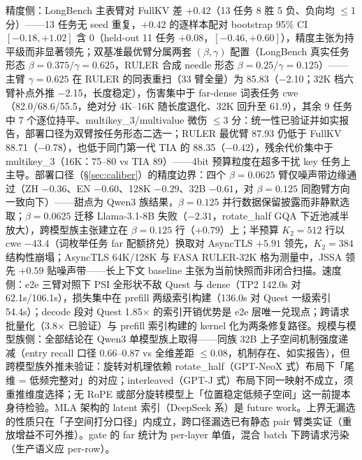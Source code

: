 \documentclass[11pt]{article}
\begin{document}
精度侧：LongBench 主表臂对 FullKV 差 +0.42（13 任务 8 胜 5 负、负向均 $\leq$1 分）——13 任务无 seed 重复，$+0.42$ 的逐样本配对 bootstrap 95\% CI $[-0.18, +1.02]$ 含 0（held-out 11 任务 $+0.08$，$[-0.46, +0.60]$），精度主张为持平级而非显著领先；双基准最优臂分属两套 $(\beta,\gamma)$ 配置（LongBench 真实任务形态 $\beta{=}0.375/\gamma{=}0.625$，RULER 合成 needle 形态 $\beta{=}0.25/\gamma{=}0.125$）——主臂 $\gamma{=}0.625$ 在 RULER 的同表重扫（33 臂全量）为 85.83（$-$2.10；32K 档六臂补点外推 $-$2.15，长度稳定），伤害集中于 far-dense 词表任务 cwe（82.0/68.6/55.5，绝对分 4K--16K 随长度退化、32K 回升至 61.9），其余 9 任务中 7 个逐位持平、multikey\_3/multivalue 微伤 $\leq$3 分：统一性已验证并如实报告，部署口径为双臂按任务形态二选一；RULER 最优臂 87.93 仍低于 FullKV 88.71（$-$0.78），也低于同门第一代 TIA 的 88.35（$-$0.42），残余代价集中于 multikey\_3（16K：75--80 vs TIA 89）——4bit 预算粒度在超多干扰 key 任务上主导。部署口径（\S\ref{sec:caliber}）的精度边界：四个 $\beta{=}0.0625$ 臂仅噪声带边缘通过（ZH $-0.36$、EN $-0.60$、128K $-0.29$、32B $-0.61$，对 $\beta{=}0.125$ 同胞臂方向一致向下）——甜点为 Qwen3 族结果，$\beta{=}0.125$ 并行数据保留披露而非静默选取；$\beta{=}0.0625$ 迁移 Llama-3.1-8B 失败（$-2.31$，rotate\_half GQA 下近池减半放大），跨模型族主张建立在 $\beta{=}0.125$ 行（$+0.79$）上；半预算 $K_2{=}512$ 行以 cwe $-43.4$（词枚举任务 far 配额挤兑）换取对 AsyncTLS $+5.91$ 领先，$K_2{=}384$ 结构性崩塌；AsyncTLS 64K/128K 与 FASA RULER-32K 格为测量中，JSSA 领先 $+0.59$ 贴噪声带——长上下文 baseline 主张为当前快照而非闭合扫描。速度侧：e2e 三臂对照下 PSI 全形状不敌 Quest 与 dense（TP2 142.0s 对 62.1s/106.1s），损失集中在 prefill 两级索引构建（136.0s 对 Quest 一级索引 54.4s）；decode 段对 Quest 1.85$\times$ 的索引开销优势是 e2e 层唯一兑现点；跨请求批量化（3.8$\times$ 已验证）与 prefill 索引构建的 kernel 化为两条修复路径。规模与模型族侧：全部结论在 Qwen3 单模型族上取得——同族 32B 上子空间机制强度递减（entry recall 口径 0.66--0.87 vs 全维差距 $\le$0.08，机制存在、如实报告），但跨模型族外推未验证：旋转对机理依赖 rotate\_half（GPT-NeoX 式）布局下「尾维 = 低频完整对」的对应；interleaved（GPT-J 式）布局下同一映射不成立，须重推维度选择；无 RoPE 或部分旋转模型上「位置稳定低频子空间」这一前提本身待检验。MLA 架构的 latent 索引（DeepSeek 系）是 future work。上界无漏选的性质只在「子空间打分口径」内成立，跨口径漏选已有静态 pair 臂类实证（重放增益不可外推）。gate 的 far 统计为 per-layer 单值，混合 batch 下跨请求污染（生产语义应 per-row）。

\end{document}
